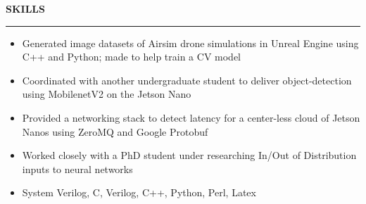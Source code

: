 \documentclass[12pt, a4paper]{article}
\begin{document}
\vspace{0cm}
%
%
\textbf{{\fontsize{12}{14}\selectfont SKILLS}}\newline
\vspace{-0.8cm}\newline
\rule{18.5cm}{0.4pt}
%
%
\vspace{-\topsep}
\begin{itemize}
  \setlength{\itemindent}{-6mm}
  \vspace{-0.2cm}\item Generated image datasets of Airsim drone simulations in Unreal Engine using C++ and Python; made to help train a CV model
  \vspace{-0.2cm}\item Coordinated with another undergraduate student to deliver object-detection using MobilenetV2 on the Jetson Nano
  \vspace{-0.2cm}\item Provided a networking stack to detect latency for a center-less cloud of Jetson Nanos using ZeroMQ and Google Protobuf
  \vspace{-0.2cm}\item Worked closely with a PhD student under researching In/Out of Distribution inputs to neural networks
  \item System Verilog, C, Verilog, C++, Python, Perl, Latex

\end{itemize}
\vspace{0cm}
\end{document}
